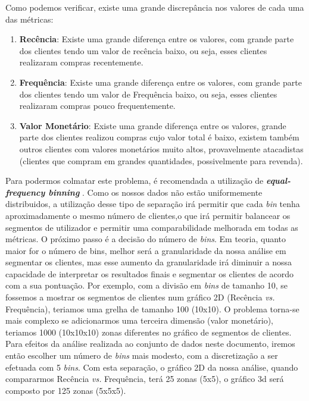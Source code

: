 \documentclass{easychair}
\begin{document}
Como podemos verificar, existe uma grande discrepância nos valores de cada uma das métricas:

\begin{enumerate}
    \item \textbf{Recência}: Existe uma grande diferença entre os valores, com grande parte dos clientes tendo um valor de recência baixo, ou seja, esses clientes realizaram compras recentemente.
    \item \textbf{Frequência}: Existe uma grande diferença entre os valores, com grande parte dos clientes tendo um valor de Frequência baixo, ou seja, esses clientes realizaram compras pouco frequentemente.
    \item \textbf{Valor Monetário}: Existe uma grande diferença entre os valores, grande parte dos clientes  realizou compras cujo valor total é baixo, existem também outros clientes com valores monetários muito altos, provavelmente atacadistas (clientes que compram em grandes quantidades, possivelmente para revenda).
\end{enumerate}

Para podermos colmatar este problema, é recomendada a utilização de \textbf{\textit{equal-frequency binning}} \cite{RFMSDM2004}. Como os nossos dados não estão uniformemente distribuidos, a utilização desse tipo de separação irá permitir que cada \textit{bin} tenha aproximadamente o mesmo número de clientes,o que irá permitir balancear os segmentos de utilizador e permitir uma comparabilidade melhorada em todas as métricas.
O próximo passo é a decisão do número de \textit{bins}. Em teoria, quanto maior for o número de bins, melhor será a granularidade da nossa análise em segmentar os clientes, mas esse aumento da granularidade irá diminuir a nossa capacidade de interpretar os resultados finais e segmentar os clientes de acordo com a sua pontuação. Por exemplo, com a divisão em \textit{bins} de tamanho 10, se fossemos a mostrar os segmentos de clientes num gráfico 2D (Recência \textit{vs.} Frequência), teriamos uma grelha de tamanho 100 (10x10). O problema torna-se mais complexo se adicionarmos uma terceira dimensão (valor monetário), teriamos 1000 (10x10x10) zonas diferentes no gráfico de segmentos de clientes. 
Para efeitos da análise realizada ao conjunto de dados neste documento, iremos então escolher um número de \textit{bins} mais modesto, com a discretização a ser efetuada com 5 \textit{bins}. Com esta separação, o gráfico 2D da nossa análise, quando compararmos Recência \textit{vs.} Frequência, terá 25 zonas (5x5), o gráfico 3d será composto por 125 zonas (5x5x5).
\end{document}
